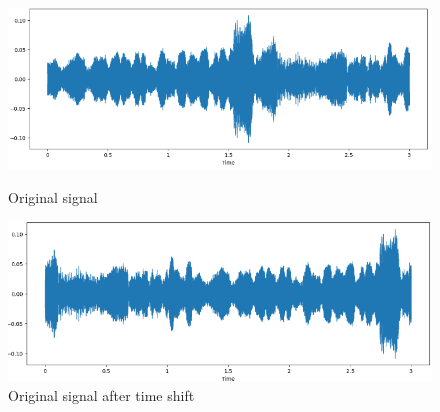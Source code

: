 \begin{figure}[H]
        \centering
        
        \begin{minipage}{0.49\textwidth}
            \centering
            \includegraphics[width=\linewidth]{images/time-shift-original-intensity.png}
            \caption*{Original signal}
        \end{minipage}%
        \hfill%
        \begin{minipage}{0.49\textwidth}
            \centering
            \includegraphics[width=\linewidth]{images/time-shift-augmented-intensity.png}
            \caption*{Original signal after time shift}
        \end{minipage}
        
        \vspace{0.5cm}
        

\end{figure}
